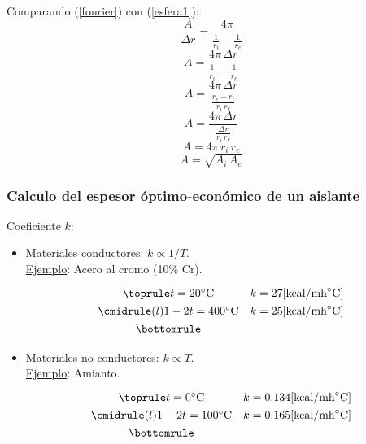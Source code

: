 Comparando (\ref{fourier}) con (\ref{esfera1}):
\begin{equation*}
    \frac{A}{\Delta r}=\frac{4\pi}{\frac{1}{r_i}-\frac{1}{r_e}}
\end{equation*}
\begin{equation*}
    A=\frac{4\pi\,\Delta r}{\frac{1}{r_i}-\frac{1}{r_e}}
\end{equation*}
\begin{equation*}
    A=\frac{4\pi\,\Delta r}{\frac{r_e-r_i}{r_i\,r_e}}
\end{equation*}
\begin{equation*}
    A=\frac{4\pi\,\Delta r}{\frac{\Delta r}{r_i\,r_e}}
\end{equation*}
\begin{equation*}
    A=4\pi\,r_i\,r_e
\end{equation*}
\begin{equation}
    A=\sqrt{A_i\,A_e}
    \label{esfera2}
\end{equation}

\subsubsection{Calculo del espesor óptimo-económico de un aislante}
Coeficiente $k$:

\begin{itemize}
    \item Materiales conductores: $k\propto 1/T$.\\
        \underline{Ejemplo}: Acero al cromo (10\% Cr).
        \begin{equation*}
        \def\arraystretch{1.3}
        \begin{array}{@{}cl@{}}
        \toprule
        t=20^\circ\text{C} & k=27[\text{kcal}/\text{mh}^\circ\text{C}]\\
        \cmidrule(l){1-2}
        t=400^\circ\text{C} & k=25[\text{kcal}/\text{mh}^\circ\text{C}]\\
        \bottomrule
        \end{array}
        \end{equation*}
    \item Materiales no conductores: $k\propto T$.\\
        \underline{Ejemplo}: Amianto.
        \begin{equation*}
        \def\arraystretch{1.3}
        \begin{array}{@{}cl@{}}
        \toprule
        t=0^\circ\text{C} & k=0.134[\text{kcal}/\text{mh}^\circ\text{C}]\\
        \cmidrule(l){1-2}
        t=100^\circ\text{C} & k=0.165[\text{kcal}/\text{mh}^\circ\text{C}]\\
        \bottomrule
        \end{array}
        \end{equation*}
\end{itemize}


